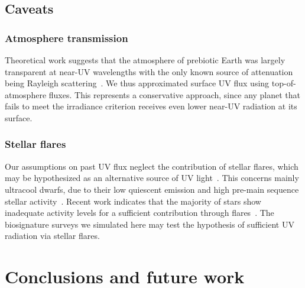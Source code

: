 \documentclass[modern,linenumbers]{aastex631}
\begin{document}
\subsection{Caveats}
\subsubsection{Atmosphere transmission}
Theoretical work suggests that the atmosphere of prebiotic Earth was largely transparent at near-UV wavelengths with the only known source of attenuation being Rayleigh scattering~\citep{Ranjan2017,Ranjan2017c}.
We thus approximated surface UV flux using top-of-atmosphere fluxes.
This represents a conservative approach, since any planet that fails to meet the irradiance criterion receives even lower near-UV radiation at its surface. 

\subsubsection{Stellar flares}
Our assumptions on past UV flux neglect the contribution of stellar flares, which may be hypothesized as an alternative source of UV light~\citep{Ranjan2017}.
This concerns mainly ultracool dwarfs, due to their low quiescent emission and high pre-main sequence stellar activity~\citep{Buccino2007,West2008}.
Recent work indicates that the majority of stars show inadequate activity levels for a sufficient contribution through flares~\citep{Glazier2020,Ducrot2020,Guenther2020}.
The biosignature surveys we simulated here may test the hypothesis of sufficient UV radiation via stellar flares.



\section{Conclusions and future work}
\end{document}
